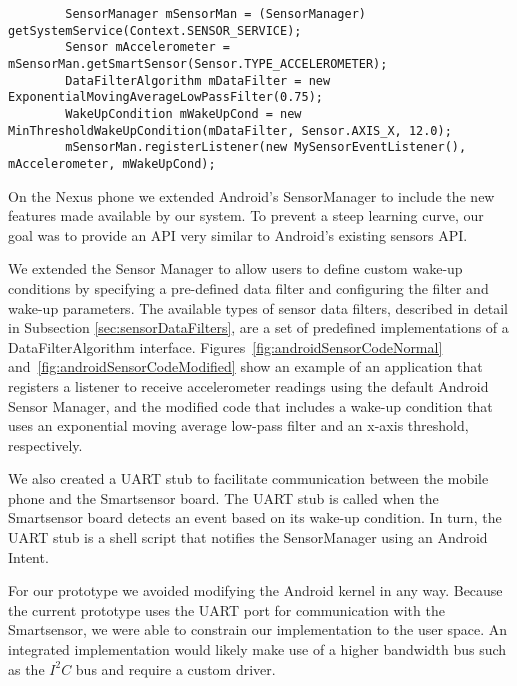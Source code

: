 \begin{figure*}[t]
{\small
	\begin{verbatim}
		SensorManager mSensorMan = (SensorManager) getSystemService(Context.SENSOR_SERVICE);
		Sensor mAccelerometer = mSensorMan.getSmartSensor(Sensor.TYPE_ACCELEROMETER);
		DataFilterAlgorithm mDataFilter = new ExponentialMovingAverageLowPassFilter(0.75);
		WakeUpCondition mWakeUpCond = new MinThresholdWakeUpCondition(mDataFilter, Sensor.AXIS_X, 12.0);
		mSensorMan.registerListener(new MySensorEventListener(), mAccelerometer, mWakeUpCond);
	\end{verbatim}
}
	\caption{Usage of the SensorManager with a wake-up condition.}
    \label{fig:androidSensorCodeModified}
\end{figure*}

On the Nexus phone we extended Android's SensorManager to include the
new features made available by our system. To prevent a steep learning
curve, our goal was to provide an API very similar to Android's
existing sensors API.  

We extended the Sensor Manager to allow users to define custom wake-up
conditions by specifying a pre-defined data filter and configuring the
filter and wake-up parameters. The available types of sensor data filters, 
described in detail in Subsection
\ref{sec:sensorDataFilters}, are a set of predefined implementations
of a DataFilterAlgorithm interface.
Figures~\ref{fig:androidSensorCodeNormal}
and~\ref{fig:androidSensorCodeModified} show an example of an
application that registers a listener to receive accelerometer
readings using the default Android Sensor Manager, and the modified
code that includes a wake-up condition that uses an exponential moving
average low-pass filter and an x-axis threshold, respectively.

We also created a UART stub to facilitate communication between the
mobile phone and the Smartsensor board. The UART stub is called when
the Smartsensor board detects an event based on its wake-up condition.
In turn, the UART stub is a shell script that notifies the
SensorManager using an Android Intent\cite{androidintents}.

For our prototype we avoided modifying the Android kernel in any way.
Because the current prototype uses the UART port for communication
with the Smartsensor, we were able to constrain our implementation to
the user space. An integrated implementation would likely make use of
a higher bandwidth bus such as the $I^2C$ bus and require a custom
driver.


